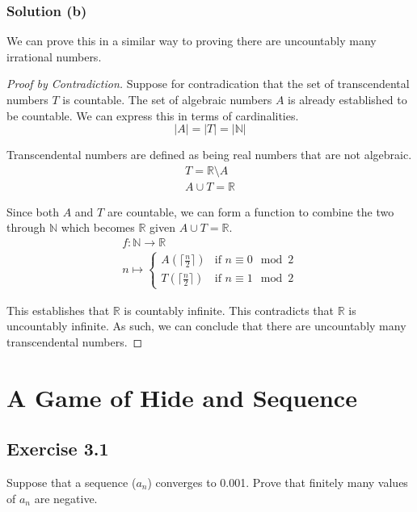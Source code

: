 \documentclass[12pt]{report}
\begin{document}
\subsection{Solution (b)}
We can prove this in a similar way to proving there are uncountably many irrational numbers.
\begin{proof}[Proof by Contradiction]
    Suppose for contradication that the set of transcendental numbers $T$ is countable.
    The set of algebraic numbers $A$ is already established to be countable.
    We can express this in terms of cardinalities.
    \begin{equation}
        |A| = |T| = |\mathbb{N}|
    \end{equation}

    Transcendental numbers are defined as being real numbers that are not algebraic.
    \begin{gather}
        T = \mathbb{R} \setminus A\\
        A \cup T = \mathbb{R}
    \end{gather}

    Since both $A$ and $T$ are countable, we can form a function to combine the two through $\mathbb{N}$ which becomes $\mathbb{R}$ given $A \cup T = \mathbb{R}$.
    \begin{gather}
        f: \mathbb{N} \to \mathbb{R}\\
        n \mapsto \begin{cases}
            A(\lceil\frac{n}{2}\rceil) &\text{if } n \equiv 0 \mod 2\\
            T(\lceil\frac{n}{2}\rceil) &\text{if } n \equiv 1 \mod 2
        \end{cases}
    \end{gather}

    This establishes that $\mathbb{R}$ is countably infinite. 
    This contradicts that $\mathbb{R}$ is uncountably infinite.
    As such, we can conclude that there are uncountably many transcendental numbers.
\end{proof}

\pagebreak

\chapter{A Game of Hide and Sequence}

\section{Exercise 3.1}
    Suppose that a sequence ($a_n$) converges to 0.001. 
    Prove that finitely many values of $a_n$ are negative. 
\end{document}
